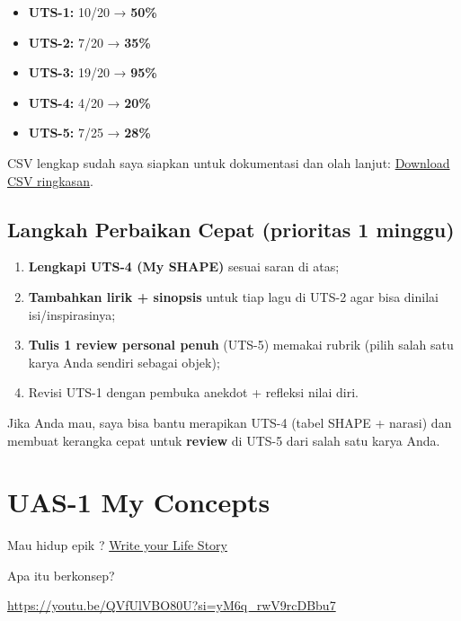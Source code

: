 \documentclass[
  letterpaper,
  DIV=11,
  numbers=noendperiod]{scrreprt}
\providecommand{\tightlist}{%
  \setlength{\itemsep}{0pt}\setlength{\parskip}{0pt}}
\begin{document}
\begin{itemize}
\tightlist
\item
  \textbf{UTS-1:} 10/20 → \textbf{50\%}
\item
  \textbf{UTS-2:} 7/20 → \textbf{35\%}
\item
  \textbf{UTS-3:} 19/20 → \textbf{95\%}
\item
  \textbf{UTS-4:} 4/20 → \textbf{20\%}
\item
  \textbf{UTS-5:} 7/25 → \textbf{28\%}
\end{itemize}

CSV lengkap sudah saya siapkan untuk dokumentasi dan olah lanjut:
\href{sandbox:/mnt/data/UTS_self_assessment.csv}{Download CSV
ringkasan}.

\section{Langkah Perbaikan Cepat (prioritas 1
minggu)}\label{langkah-perbaikan-cepat-prioritas-1-minggu}

\begin{enumerate}
\def\labelenumi{\arabic{enumi}.}
\tightlist
\item
  \textbf{Lengkapi UTS-4 (My SHAPE)} sesuai saran di atas;
\item
  \textbf{Tambahkan lirik + sinopsis} untuk tiap lagu di UTS-2 agar bisa
  dinilai isi/inspirasinya;
\item
  \textbf{Tulis 1 review personal penuh} (UTS-5) memakai rubrik (pilih
  salah satu karya Anda sendiri sebagai objek);
\item
  Revisi UTS-1 dengan pembuka anekdot + refleksi nilai diri.
\end{enumerate}

Jika Anda mau, saya bisa bantu merapikan UTS-4 (tabel SHAPE + narasi)
dan membuat kerangka cepat untuk \textbf{review} di UTS-5 dari salah
satu karya Anda.


\chapter{UAS-1 My Concepts}\label{uas-1-my-concepts}

Mau hidup epik ? \href{lifestory.pdf}{Write your Life Story}

Apa itu berkonsep?

\url{https://youtu.be/QVfUlVBO80U?si=yM6q_rwV9rcDBbu7}

\end{document}
